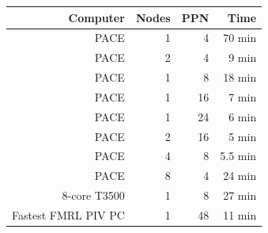 \documentclass{article}
\begin{document}
\begin{enumerate}
		\begin{figure}[h!]
			\centering
				\begin{tabular}{r | r | r | r}
				Computer & Nodes & PPN & Time \\ \hline
				PACE & 1 & 4 & 70 min \\
				PACE & 2 & 4 & 9 min \\
				PACE & 1 & 8 & 18 min \\
				PACE & 1 & 16 & 7 min \\
				PACE & 1 & 24 & 6 min \\
				PACE & 2 & 16 & 5 min \\
				PACE & 4 & 8 & 5.5 min \\
				PACE & 8 & 4 & 24 min \\
				8-core T3500 & 1 & 8 & 27 min \\
				Fastest FMRL PIV PC & 1 & 48 & 11 min 
			\end{tabular}
		\end{figure}
	\end{enumerate}
\end{document}
